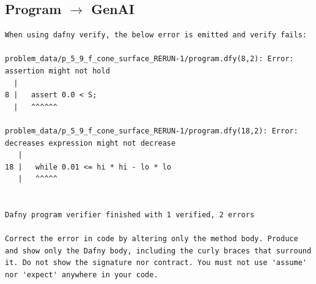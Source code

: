 \documentclass{article}
\begin{document}
\subsection*{Program $\rightarrow$ GenAI}
\begin{lstlisting}
When using dafny verify, the below error is emitted and verify fails:

problem_data/p_5_9_f_cone_surface_RERUN-1/program.dfy(8,2): Error: assertion might not hold
  |
8 |   assert 0.0 < S;
  |   ^^^^^^

problem_data/p_5_9_f_cone_surface_RERUN-1/program.dfy(18,2): Error: decreases expression might not decrease
   |
18 |   while 0.01 <= hi * hi - lo * lo
   |   ^^^^^


Dafny program verifier finished with 1 verified, 2 errors

Correct the error in code by altering only the method body. Produce and show only the Dafny body, including the curly braces that surround it. Do not show the signature nor contract. You must not use 'assume' nor 'expect' anywhere in your code.
\end{lstlisting}
\end{document}
